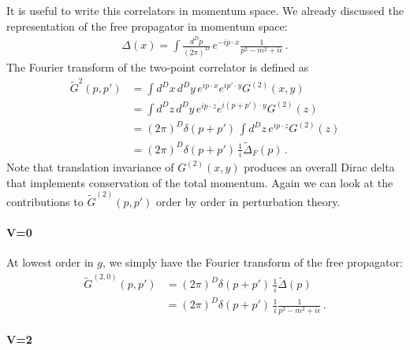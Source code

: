 \documentclass[notes]{subfiles}
\begin{document}
It is useful to write this correlators in momentum space. We already
discussed the representation of the free propagator in momentum space: 
\begin{align}
  \Delta(x) = \int \frac{d^Dp}{(2\pi)^D}\, e^{-ip\cdot x}
  \frac{1}{p^2 - m^2 + i\epsilon}\, .
\end{align}
The Fourier transform of the two-point correlator is defined as
\begin{align}
  \tilde{G}^{2}\left(p,p'\right) 
  &= 
    \int d^Dx\, d^Dy\, e^{ip\cdot x} e^{ip'\cdot y} 
    G^{(2)}(x,y) \\
  &= \int d^Dz\, d^Dy\, e^{ip\cdot z} e^{i(p+p')\cdot y} G^{(2)}(z) \\
  &= \left(2\pi\right)^D \delta(p+p')\, \int d^Dz\, e^{ip\cdot z}
    G^{(2)}(z)  \\
  &= \left(2\pi\right)^D \delta(p+p')\, \frac{1}{i} \tilde{\Delta}_F(p)\, .
\end{align}
Note that translation invariance of $G^{(2)}(x,y)$ produces an overall
Dirac delta that implements conservation of the total momentum. Again
we can look at the contributions to $\tilde{G}^{(2)}(p,p')$ order by
order in perturbation theory. 

\paragraph{V=0}

At lowest order in $g$, we simply have the Fourier transform of the
free propagator:
\begin{align}
  \tilde{G}^{(2,0)}(p,p') 
  &= 
    \left(2\pi\right)^D \delta(p+p')\,
    \frac{1}{i} \tilde{\Delta}(p) \\
  &=
    \left(2\pi\right)^D \delta(p+p')\,
    \frac{1}{i} \frac{1}{p^2-m^2+i\epsilon}\, .
\end{align}

\paragraph{V=2}
\end{document}
